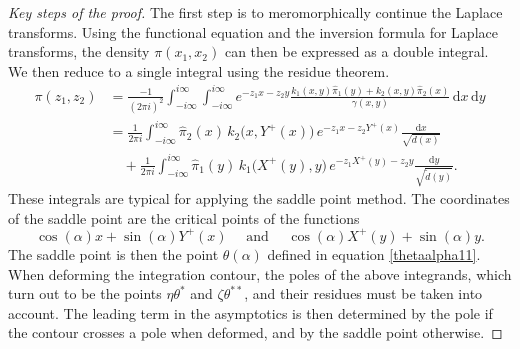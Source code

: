 \documentclass[11pt]{article}
\theoremstyle{definition}
\begin{document}
\begin{proof}[Key steps of the proof]
The first step is to meromorphically continue the Laplace transforms.
Using the functional equation and the inversion formula for Laplace transforms,
the density $\pi(x_1,x_2)$ can then be expressed as a double integral.
We then reduce to a single integral using the residue theorem.
\begin{align*}
\pi(z_1,z_2)
&=\frac{-1}{(2\pi i)^2} \int_{-i\infty}^{i\infty} \int_{-i\infty}^{i\infty}
e^{-z_1 x - z_2 y}
\frac{k_1(x,y)\widehat \pi_1(y)+k_2(x,y)\widehat \pi_2(x)}{\gamma(x,y)}
\,\mathrm{d} x \,\mathrm{d} y 
\\
&= \frac{1}{2\pi i} \int_{-i\infty}^{i\infty}
\widehat \pi_2(x)\,k_2\!\bigl(x, Y^+(x)\bigr)\, e^{-z_1 x - z_2 Y^+(x)}
\frac{\mathrm{d} x}{\sqrt{ d(x) }} 
\\
&\quad+\frac{1}{2\pi i} \int_{-i\infty}^{i\infty}
\widehat \pi_1(y)\,k_1\!\bigl(X^+(y), y\bigr)\, e^{-z_1 X^+(y) - z_2 y}
\frac{\mathrm{d} y}{\sqrt{ \widetilde d (y) }}.
\end{align*}
These integrals are typical for applying the saddle point method. 
The coordinates of the saddle point are the critical points of the functions
\begin{equation*}
\cos(\alpha)x+\sin(\alpha)Y^+(x)\quad \text{ and }\quad \cos(\alpha)X^+(y)+\sin(\alpha)y.
\end{equation*}
The saddle point is then the point $\theta(\alpha)$ defined in equation 
\eqref{thetaalpha11}. 
When deforming the integration contour, the poles of the above integrands, which turn out to be the points $\eta\theta^*$ and $\zeta\theta^{**}$, and their residues must be taken into account. 
The leading term in the asymptotics is then determined by the pole if the contour crosses a pole when deformed, and by the saddle point otherwise.
\end{proof}


\end{document}
